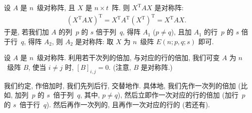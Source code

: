 \documentclass[../libro.tex]{subfiles}
\begin{document}
设 \(A\) 是 \(n\)~级对称阵,
且 \(X\) 是 \(n \times t\)~阵.
则 \(X^{\mathrm{T}} A X\) 是对称阵:
\begin{align*}
    (X^{\mathrm{T}} A X)^{\mathrm{T}}
    = X^{\mathrm{T}} A^{\mathrm{T}} (X^{\mathrm{T}})^{\mathrm{T}}
    = X^{\mathrm{T}} A X.
\end{align*}
于是,
若我们加 \(A\) 的列~\(p\) 的 \(s\) 倍于列~\(q\), 得阵 \(A_1\)
(\(p \neq q\)),
且加 \(A_1\) 的行~\(p\) 的 \(s\) 倍于行~\(q\), 得阵 \(A_2\),
则 \(A_2\) 是对称阵:
取 \(X\) 为 \(n\)~级阵 \(E(n; p, q; s)\) 即可.

\begin{theorem}
    设 \(A\) 是 \(n\)~级对称阵.
    利用若干次列的倍加, 与对应的行的倍加,
    我们可变 \(A\) 为 \(n\)~级阵 \(B\),
    使当 \(i \neq j\) 时, \([B]_{i,j} = 0\).
    (注意, \(B\) 是对称阵.)

    我们约定, 作倍加时, 我们先列后行, 交替地作.
    具体地, 我们先作一次列的倍加
    (比如, 加列~\(p\) 的 \(s\)~倍于列~\(q\),
    其中, \(p \neq q\)),
    然后立即作一次对应的行的倍加
    (加行~\(p\) 的 \(s\)~倍于行~\(q\)).
    然后再作一次列的, 且再作一次对应的行的 (若还有).
\end{theorem}
\end{document}
